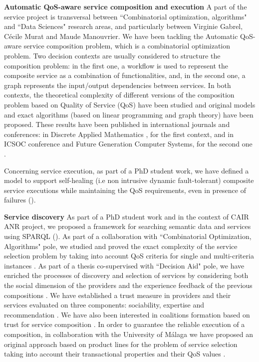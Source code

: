 \textbf{Automatic QoS-aware service composition and execution}
A part of the service project is transversal between ``Combinatorial optimization, algorithms" and ``Data Sciences" research areas, and particularly between Virginie Gabrel, C{\'e}cile Murat and Maude Manouvrier. We have been tackling the Automatic QoS-aware service composition problem, which is a combinatorial optimization problem. Two decision contexts are usually considered to structure the composition problem: in the first one, a workflow is used to represent the composite service as a combination of functionalities, and, in the second one, a graph represents the input/output dependencies between services. In both contexts, the theoretical complexity of different versions of the composition problem based on Quality of Service (QoS) have been studied and original models and exact algorithms (based on linear programming and graph theory) have been proposed. These results have been published in international journals and conferences: in Discrete Applied Mathematics \cite{DBLP:journals/dam/GabrelMM15}, for the first context, and in ICSOC conference \cite{DBLP:conf/icsoc/GabrelMM14} and Future Generation Computer Systems, for the second one \cite{GMMM17}.

Concerning service execution, as part of a PhD student work, we have defined a model to support self-healing (i.e non intrusive dynamic fault-tolerant) composite service executions while maintaining the QoS requirements, even in presence of failures (\cite{AngaritaArocha2016Modeling-1159056,AngaritaArocha2012FaCETa:-619549,AngaritaArocha2015Dynamic-1061562}). 

\textbf{Service discovery}
As part of a PhD student work and in the context of CAIR ANR project, we proposed a framework for searching semantic data and services using SPARQL (\cite{Mouhoub2014A-1061556,Mouhoub2015LIDSEARCH:-1061527}).
As part of a collaboration with ``Combinatorial Optimization, Algorithms" pole, we studied and proved the exact complexity of the service selection problem by taking into account QoS criteria for single and multi-criteria instances \cite{Abu-Khzam2015On-1017005}. As part of a thesis co-supervised with ``Decision Aid" pole, we have enriched the processes of discovery and selection of services by considering both the social dimension of the providers and the experience feedback of the previous compositions \cite{Louati2015A-1250421, Louati2014A-990319, Louati2014A-1298436}. We have established a trust measure in providers and their services evaluated on three components: sociability, expertise and recommendation \cite{Louati2014Towards-1307413}.
We have also been interested in coalitions formation based on trust for service composition \cite{Louati2015Trust-Based-1269604}.
In order to guarantee the reliable execution of a composition, in collaboration with the University of M\'alaga we have proposed an original approach based on product lines for the problem of service selection taking into account their transactional properties and their QoS values \cite{Gamez2015SPL-TQSSS:-1298429}.

